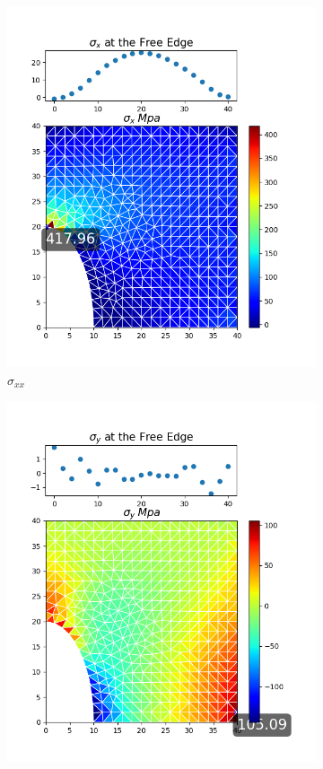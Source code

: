\documentclass[twoside,twocolumn,10pt]{article}
\begin{document}
\begin{figure}[!ht]
  \begin{subfigure}[c]{0.26\textwidth}
    \includegraphics[width=1.\linewidth]{Q2_5/Q5_0.5_x_triangle.png}
    \caption{$\sigma_{xx}$}
    \label{fig:x_triangle_0.5}
  \end{subfigure}%
  \begin{subfigure}[c]{0.26\textwidth}
    \includegraphics[width=1.\linewidth]{Q2_5/Q5_0.5_y_triangle.png}

\end{subfigure}
\end{figure}
\end{document}
